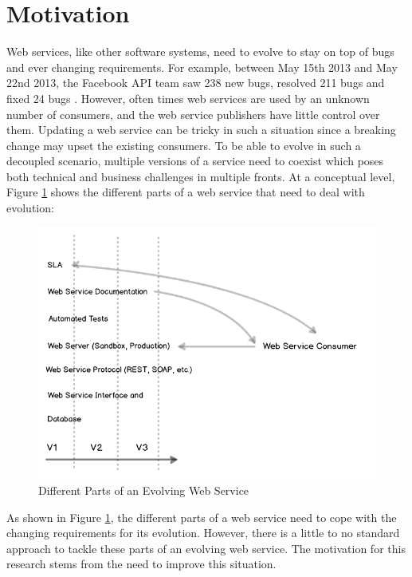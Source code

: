 \documentclass[runningheads,a4paper]{llncs}
\begin{document}
\section{Motivation} %
\label{sec:motivation}
Web services, like other software systems, need to evolve to stay on top of bugs and ever changing requirements. For example, between May 15th 2013 and May 22nd 2013, the Facebook API team saw 238 new bugs, resolved 211 bugs and fixed 24 bugs \cite{facebook_release_note}. However, often times web services are used by an unknown number of consumers, and the web service publishers have little control over them. Updating a web service can be tricky in such a situation since a breaking change may upset the existing consumers. To be able to evolve in such a decoupled scenario, multiple versions of a service need to coexist which poses both technical and business challenges in multiple fronts. At a conceptual level, Figure \ref{fig:web_service_layers} shows the different parts of a web service that need to deal with evolution:


\begin{figure}[ht]
  \centering
  \includegraphics[width=\textwidth]{web_service_layers.png}
    \caption{Different Parts of an Evolving Web Service}
  \label{fig:web_service_layers}
\end{figure}

As shown in Figure \ref{fig:web_service_layers}, the different parts of a web service need to cope with the changing requirements for its evolution. However, there is a little to no standard approach to tackle these parts of an evolving web service. The motivation for this research stems from the need to improve this situation.
\end{document}
